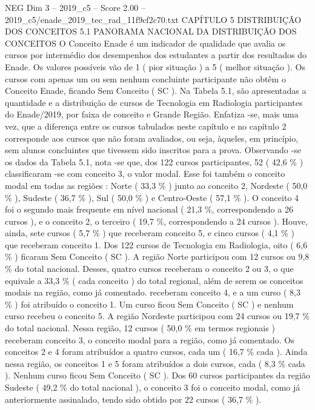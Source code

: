 \begin{textsample}{NEG Dim 3 – 2019\_c5 – Score 2.00 – 2019\_c5/enade\_2019\_tec\_rad\_11f9cf2c70.txt}  \label{ex:f3_neg_194}
CAPÍTULO 5 DISTRIBUIÇÃO DOS CONCEITOS 5.1 PANORAMA NACIONAL DA DISTRIBUIÇÃO DOS CONCEITOS O Conceito Enade é um indicador de qualidade que avalia os cursos por intermédio dos desempenhos dos estudantes a partir dos resultados do Enade.
Os valores possíveis vão de 1 ( pior situação ) a 5 ( melhor situação ).
Os cursos com apenas um ou sem nenhum concluinte participante não obtêm o Conceito Enade, ficando Sem Conceito ( SC ).
Na Tabela 5.1, são apresentadas a quantidade e a distribuição de cursos de Tecnologia em Radiologia participantes do Enade/2019, por faixa de conceito e Grande Região.
Enfatiza -se, mais uma vez, que a diferença entre os cursos tabulados neste capítulo e no capítulo 2 corresponde aos cursos que não foram avaliados, ou seja, àqueles, em princípio, sem alunos concluintes que tivessem sido inscritos para a prova.
Observando -se os dados da Tabela 5.1, nota -se que, dos 122 cursos participantes, 52 ( 42,6 \% ) classificaram -se com conceito 3, o valor modal.
Esse foi também o conceito modal em todas as regiões : Norte ( 33,3 \% ) junto ao conceito 2, Nordeste ( 50,0 \% ), Sudeste ( 36,7 \% ), Sul ( 50,0 \% ) e Centro-Oeste ( 57,1 \% ).
O conceito 4 foi o segundo mais frequente em nível nacional ( 21,3 \%, correspondendo a 26 cursos ), e o conceito 2, o terceiro ( 19,7 \%, correspondendo a 24 cursos ).
Houve, ainda, sete cursos ( 5,7 \% ) que receberam conceito 5, e cinco cursos ( 4,1 \% ) que receberam conceito 1.
Dos 122 cursos de Tecnologia em Radiologia, oito ( 6,6 \% ) ficaram Sem Conceito ( SC ).
A região Norte participou com 12 cursos ou 9,8 \% do total nacional.
Desses, quatro cursos receberam o conceito 2 ou 3, o que equivale a 33,3 \% ( cada conceito ) do total regional, além de serem os conceitos modais na região, como já comentado. receberam conceito 4, e a um curso ( 8,3 \% ) foi atribuído o conceito 1.
Um curso ficou Sem Conceito ( SC ) e nenhum curso recebeu o conceito 5.
A região Nordeste participou com 24 cursos ou 19,7 \% do total nacional.
Nessa região, 12 cursos ( 50,0 \% em termos regionais ) receberam conceito 3, o conceito modal para a região, como já comentado.
Os conceitos 2 e 4 foram atribuídos a quatro cursos, cada um ( 16,7 \% cada ).
Ainda nessa região, os conceitos 1 e 5 foram atribuídos a dois cursos, cada ( 8,3 \% cada ).
Nenhum curso ficou Sem Conceito ( SC ).
Dos 60 cursos participantes da região Sudeste ( 49,2 \% do total nacional ), o conceito 3 foi o conceito modal, como já anteriormente assinalado, tendo sido obtido por 22 cursos ( 36,7 \% ).

\end{textsample}
